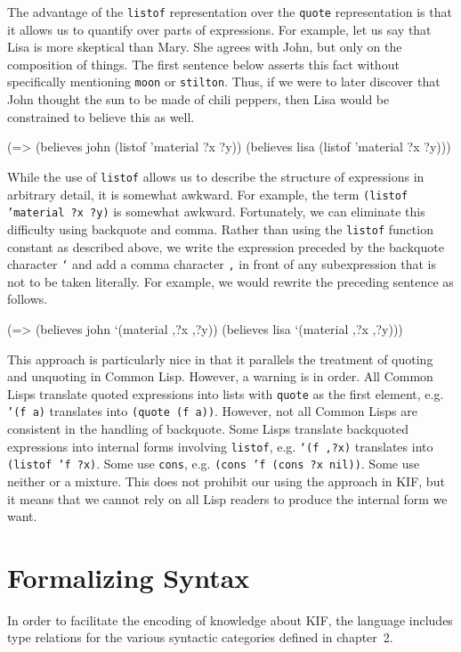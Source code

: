 The advantage of the {\tt listof} representation over the {\tt quote}
representation is that it allows us to quantify over parts of expressions.  For
example, let us say that Lisa is more skeptical than Mary.  She agrees with
John, but only on the composition of things.  The first sentence below asserts
this fact without specifically mentioning {\tt moon} or {\tt stilton}.  Thus, if
we were to later discover that John thought the sun to be made of chili peppers,
then Lisa would be constrained to believe this as well.

\medskip
\beginverbatim
(=> (believes john (listof 'material ?x ?y))
    (believes lisa (listof 'material ?x ?y)))
\endverbatim
\medskip

While the use of {\tt listof} allows us to describe the structure of expressions
in arbitrary detail, it is somewhat awkward.  For example, the term {\tt (listof
'material ?x ?y)} is somewhat awkward.  Fortunately, we can eliminate this
difficulty using backquote and comma.  Rather than using the {\tt listof}
function constant as described above, we write the expression preceded by the
backquote character {\tt `} and add a comma character {\tt ,} in front of any
subexpression that is not to be taken literally.  For example, we would rewrite
the preceding sentence as follows.

\medskip
\beginverbatim
(=> (believes john `(material ,?x ,?y))
    (believes lisa `(material ,?x ,?y)))
\endverbatim
\medskip

This approach is particularly nice in that it parallels the treatment of quoting
and unquoting in Common Lisp.  However, a warning is in order.  All Common
Lisps translate quoted expressions into lists with {\tt quote} as the
first element, e.g. {\tt '(f a)} translates into {\tt (quote (f a))}. 
However, not all Common Lisps are consistent in the handling of
backquote.  Some Lisps translate backquoted expressions into internal
forms involving {\tt listof}, e.g. {\tt `(f ,?x)} translates into {\tt
(listof 'f ?x)}.  Some use {\tt cons}, e.g. {\tt (cons 'f (cons ?x
nil))}.  Some use neither or a mixture.  This does not prohibit our
using the approach in KIF, but it means that we cannot rely on all
Lisp readers to produce the internal form we want.

\section{Formalizing Syntax}

In order to facilitate the encoding of knowledge about KIF, the language
includes type relations for the various syntactic categories defined in
chapter~2.

